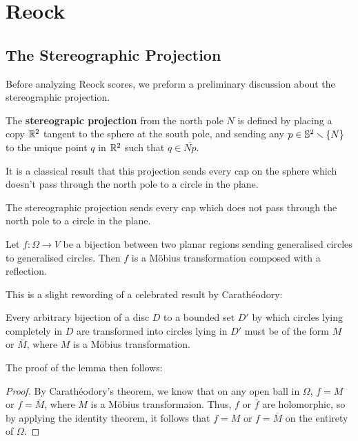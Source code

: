 \section{Reock}\label{sec:reock}
\subsection{The Stereographic Projection}
Before analyzing Reock scores, we preform a preliminary 
discussion about the stereographic projection.
\begin{definition}
  The \textbf{stereograpic projection} from the north pole $N$ is
  defined by placing a copy $\mathbb{R}^2$ tangent to the sphere at the south
  pole, and sending any $p\in \mathbb{S}^2\smallsetminus \{N\}$ to 
  the unique point $q$ in $\mathbb{R}^2$ such that $q\in \overline{Np}$.
\end{definition}
\begin{remark}
  It is a classical result that this projection sends every cap on
  the sphere which doesn't pass through the north pole to a circle in
  the plane. 
\end{remark}
\begin{lemma}
  The stereographic projection sends every cap which does not pass
  through the north pole to a circle in the plane.
\end{lemma}

\begin{lemma}
  Let $f:\Omega\to V$ be a bijection between two planar regions 
  sending generalised circles to generalised circles. 
  Then $f$ is a M\"{o}bius transformation composed with a 
  reflection.
\end{lemma}
This is a slight rewording of a celebrated result by 
Carath\'{e}odory\cite{caratheodory}:
\begin{theorem}
  Every arbitrary bijection of a disc $D$ to a bounded set $D'$ by which
  circles lying completely in $D$ are transformed into circles 
  lying in $D'$ must be of the form $M$ or $\bar M$, where $M$ is a 
  M\"{o}bius transformation.
\end{theorem}
The proof of the lemma then follows:
\begin{proof}
  By Carath\'{e}odory's theorem, we know that on any open 
  ball in $\Omega$, $f=M$ or $f=\bar M$, where 
  $M$ is a M\"{o}bius transformaion. Thus, $f$ or $\bar f$ 
  are holomorphic, so by applying the identity theorem, 
  it follows that $f = M$ or $f = \bar M$ on the entirety of 
  $\Omega$.
\end{proof}

